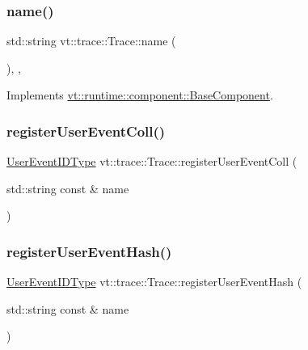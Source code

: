 \mbox{\label{structvt_1_1trace_1_1_trace_aaae4bbf6d009229a5c8b9db67a127942}} 
\subsubsection{\texorpdfstring{name()}{name()}}
{\footnotesize\ttfamily std\+::string vt\+::trace\+::\+Trace\+::name (\begin{DoxyParamCaption}{ }\end{DoxyParamCaption})\hspace{0.3cm}{\ttfamily [inline]}, {\ttfamily [override]}, {\ttfamily [virtual]}}



Implements \hyperlink{structvt_1_1runtime_1_1component_1_1_base_component_a7701485f3539f78d42e6bad47fc7eb78}{vt\+::runtime\+::component\+::\+Base\+Component}.

\mbox{\label{structvt_1_1trace_1_1_trace_a9a106f7f39e605745994d20bb526f8cf}} 
\subsubsection{\texorpdfstring{register\+User\+Event\+Coll()}{registerUserEventColl()}}
{\footnotesize\ttfamily \hyperlink{namespacevt_1_1trace_a5908920d051c144c89f17c69ed262350}{User\+Event\+I\+D\+Type} vt\+::trace\+::\+Trace\+::register\+User\+Event\+Coll (\begin{DoxyParamCaption}\item[{std\+::string const \&}]{name }\end{DoxyParamCaption})}

\mbox{\label{structvt_1_1trace_1_1_trace_a1b80a8ca6bebbfbe61f8b119342e14f7}} 
\subsubsection{\texorpdfstring{register\+User\+Event\+Hash()}{registerUserEventHash()}}
{\footnotesize\ttfamily \hyperlink{namespacevt_1_1trace_a5908920d051c144c89f17c69ed262350}{User\+Event\+I\+D\+Type} vt\+::trace\+::\+Trace\+::register\+User\+Event\+Hash (\begin{DoxyParamCaption}\item[{std\+::string const \&}]{name }\end{DoxyParamCaption})}

